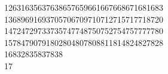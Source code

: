 \begin{tabbing}
12631635637638657659661667668671681683\\[0pt]
13689691693705706709710712715717718720\\[0pt]
14724729733735747748750752754757777780\\[0pt]
15784790791802804807808811814824827828\\[0pt]
16832835837838\\[0pt]
17\>\end{tabbing}
